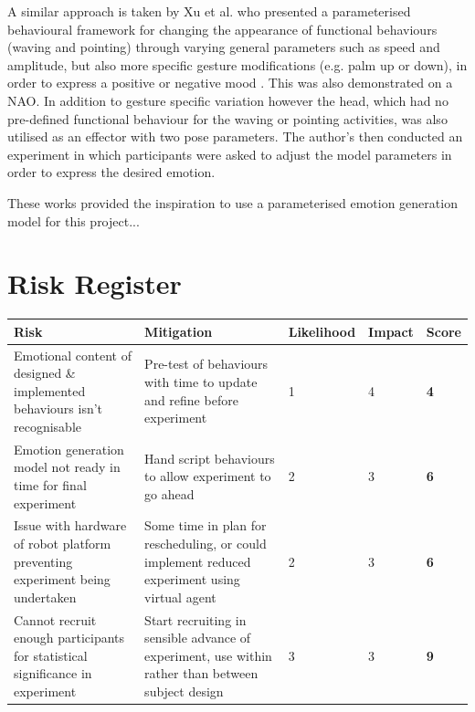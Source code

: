 \documentclass[11pt]{article}
\begin{document}
A similar approach is taken by Xu et al. who presented a parameterised behavioural framework for changing the appearance of functional behaviours (waving and pointing) through varying general parameters such as speed and amplitude, but also more specific gesture modifications (e.g. palm up or down), in order to express a positive or negative mood \cite{xu2013mood}. This was also demonstrated on a NAO. In addition to gesture specific variation however the head, which had no pre-defined functional behaviour for the waving or pointing activities, was also utilised as an effector with two pose parameters. The author's then conducted an experiment in which participants were asked to adjust the model parameters in order to express the desired emotion. 

These works provided the inspiration to use a parameterised emotion generation model for this project...

\section{Risk Register}
\begin{center}
	\begin{tabular}{|m{6cm}|m{5cm}|m{1.8cm}|m{1cm}|m{1cm}|}
		\hline
		Risk & Mitigation & Likelihood & Impact & \textbf{Score} \\
		\hline 
		Emotional content of designed \& implemented behaviours isn’t recognisable & Pre-test of behaviours with time to update and refine before experiment & 1 & 4 & \textbf{4} \\ 
		\hline
		Emotion generation model not ready in time for final experiment & Hand script behaviours to allow experiment to go ahead & 2 & 3 & \textbf{6} \\ 
		\hline
		Issue with hardware of robot platform preventing experiment being undertaken & Some time in plan for rescheduling, or could implement reduced experiment using virtual agent & 2 & 3 & \textbf{6} \\
		\hline 
		Cannot recruit enough participants for statistical significance in experiment & Start recruiting in sensible advance of experiment, use within rather than between subject design & 3 & 3 & \textbf{9} \\
		\hline
	\end{tabular} 
\end{center}
\end{document}
